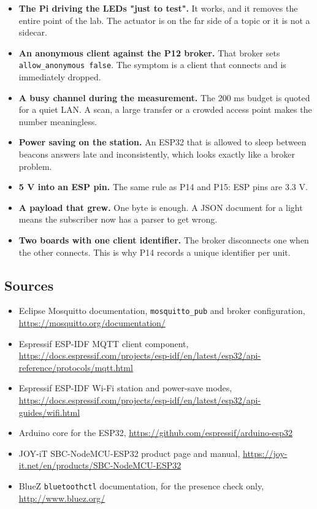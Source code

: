 \begin{itemize}
\item \textbf{The Pi driving the LEDs "just to test".} It works, and it removes the entire point of the lab. The actuator is on the far side of a topic or it is not a sidecar.
\item \textbf{An anonymous client against the P12 broker.} That broker sets \texttt{allow\_anonymous false}. The symptom is a client that connects and is immediately dropped.
\item \textbf{A busy channel during the measurement.} The 200 ms budget is quoted for a quiet LAN. A scan, a large transfer or a crowded access point makes the number meaningless.
\item \textbf{Power saving on the station.} An ESP32 that is allowed to sleep between beacons answers late and inconsistently, which looks exactly like a broker problem.
\item \textbf{5 V into an ESP pin.} The same rule as P14 and P15: ESP pins are 3.3 V.
\item \textbf{A payload that grew.} One byte is enough. A JSON document for a light means the subscriber now has a parser to get wrong.
\item \textbf{Two boards with one client identifier.} The broker disconnects one when the other connects. This is why P14 records a unique identifier per unit.
\end{itemize}

\subsection*{Sources}

\begin{itemize}
\item Eclipse Mosquitto documentation, \texttt{mosquitto\_pub} and broker configuration, \url{https://mosquitto.org/documentation/}
\item Espressif ESP-IDF MQTT client component, \url{https://docs.espressif.com/projects/esp-idf/en/latest/esp32/api-reference/protocols/mqtt.html}
\item Espressif ESP-IDF Wi-Fi station and power-save modes, \url{https://docs.espressif.com/projects/esp-idf/en/latest/esp32/api-guides/wifi.html}
\item Arduino core for the ESP32, \url{https://github.com/espressif/arduino-esp32}
\item JOY-iT SBC-NodeMCU-ESP32 product page and manual, \url{https://joy-it.net/en/products/SBC-NodeMCU-ESP32}
\item BlueZ \texttt{bluetoothctl} documentation, for the presence check only, \url{http://www.bluez.org/}
\end{itemize}
